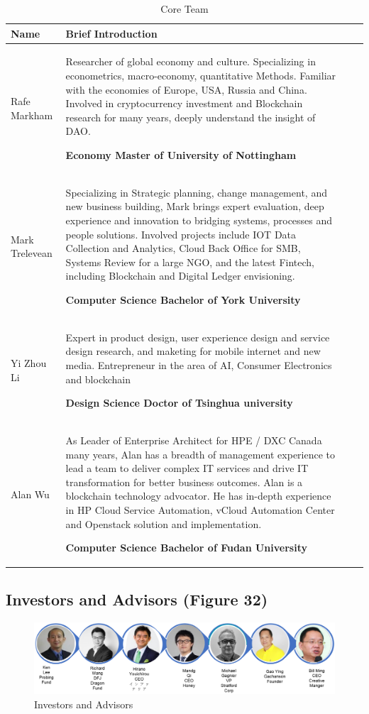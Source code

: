 \documentclass[fleqn,10pt]{SelfArx} %
\begin{document}
\begin{table}[!hbt]
\caption{Core Team}
\centering
\begin{tabular}{lp{13cm}p{2cm}r}
\toprule
Name
 & 
Brief Introduction\\
\midrule
Rafe Markham
 & 
Researcher of global economy and culture. Specializing in econometrics, macro-economy, quantitative Methods. Familiar with the economies of Europe, USA, Russia and China. Involved in cryptocurrency investment and Blockchain research for many years, deeply understand the insight of DAO. 

\textbf{Economy
Master of University of Nottingham}
\\
\midrule
Mark Trelevean
 & 
Specializing in Strategic planning, change management, and new business building, Mark brings expert evaluation, deep experience and innovation to bridging systems, processes and people solutions. Involved projects include IOT Data Collection and Analytics, Cloud Back Office for SMB, Systems Review for a large NGO, and the latest Fintech, including Blockchain and Digital Ledger envisioning. 

\textbf{Computer Science 
Bachelor of York University }
\\
\midrule
Yi Zhou Li
 & 
Expert in product design, user experience design and service design research, and maketing for mobile internet and new media.
Entrepreneur in the area of AI, Consumer Electronics and blockchain
 

\textbf{Design Science
Doctor of Tsinghua university}
\\
\midrule
Alan Wu
 & 
As Leader of Enterprise Architect for HPE / DXC Canada many years, Alan has a breadth of management experience to lead a team to deliver complex IT services and drive IT transformation for better business outcomes. Alan is a blockchain technology advocator. He has in-depth experience in HP Cloud Service Automation, vCloud Automation Center and Openstack solution and implementation. 

\textbf{Computer Science
Bachelor of Fudan University}
\\
\bottomrule
\end{tabular}
\label{tab:label}
\end{table}

\subsection{Investors and Advisors (Figure 32)}

\begin{figure}[!hbt]\centering %
\includegraphics[width=\linewidth]{33}
\caption{Investors and Advisors}
\label{fig:33}
\end{figure}
\end{document}
